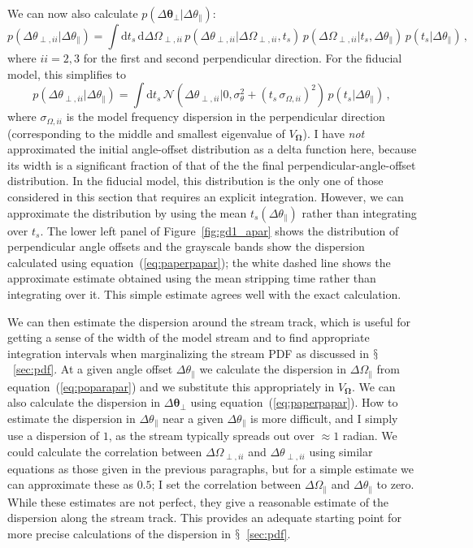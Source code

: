 \documentclass[12pt,preprint]{aastex}
\newcommand{\dd}{\mathrm{d}}
\newcommand{\eqnname}{equation}
\newcommand{\equationname}{\eqnname}
\renewcommand{\figurename}{Figure}
\newcommand{\sectionname}{$\mathsection$}
\renewcommand{\vec}[1]{\ensuremath{\mathbf{#1}}}
\newcommand{\veco}{\ensuremath{\vec{\Omega}}}
\newcommand{\veca}{\ensuremath{\boldsymbol\theta}}
\newcommand{\apar}{\ensuremath{\theta_\parallel}}
\newcommand{\opar}{\ensuremath{\Omega_\parallel}}
\newcommand{\aperp}{\ensuremath{\veca_\perp}}
\newcommand{\aperpii}{\ensuremath{\theta_{\perp,ii}}}
\newcommand{\operpii}{\ensuremath{\Omega_{\perp,ii}}}
\newcommand{\ts}{\ensuremath{t_s}}
\begin{document}
We can now also calculate $p(\Delta \aperp|\Delta \apar)$:
\begin{equation}
  p(\Delta \aperpii|\Delta \apar) = \int \dd \ts \,\dd \Delta
  \operpii \,p(\Delta \aperpii|\Delta \operpii,\ts)\,p(\Delta \operpii|\ts,\Delta \apar)\,p(\ts|\Delta \apar)\,,
\end{equation}
where $ii=2,3$ for the first and second perpendicular direction. For
the fiducial model, this simplifies to
\begin{equation}\label{eq:paperpapar}
  p(\Delta \aperpii|\Delta \apar) = \int \dd \ts \,\mathcal{N}\left(\Delta \aperpii|0,\sigma_{\theta}^2+(\ts\,\sigma_{\Omega,ii})^2\right)\,p(\ts|\Delta \apar)\,,
\end{equation}
where $\sigma_{\Omega,ii}$ is the model frequency dispersion in the
perpendicular direction (corresponding to the middle and smallest
eigenvalue of $V_\veco$). I have \emph{not} approximated the initial
angle-offset distribution as a delta function here, because its width
is a significant fraction of that of the the final
perpendicular-angle-offset distribution. In the fiducial model, this
distribution is the only one of those considered in this section that
requires an explicit integration. However, we can approximate the
distribution by using the mean $\ts(\Delta \apar)$ rather than
integrating over $\ts$. The lower left panel of
\figurename~\ref{fig:gd1_apar} shows the distribution of perpendicular
angle offsets and the grayscale bands show the dispersion calculated
using \equationname~(\ref{eq:paperpapar}); the white dashed line shows
the approximate estimate obtained using the mean stripping time rather
than integrating over it. This simple estimate agrees well with the
exact calculation.

We can then estimate the dispersion around the stream track, which is
useful for getting a sense of the width of the model stream and to
find appropriate integration intervals when marginalizing the stream
PDF as discussed in \sectionname~\ref{sec:pdf}. At a given angle
offset $\Delta \apar$ we calculate the dispersion in $\Delta \opar$
from \equationname~(\ref{eq:poparapar}) and we substitute this
appropriately in $V_\veco$. We can also calculate the dispersion in
$\Delta \aperp$ using \equationname~(\ref{eq:paperpapar}). How to
estimate the dispersion in $\Delta \apar$ near a given $\Delta \apar$
is more difficult, and I simply use a dispersion of $1$, as the stream
typically spreads out over $\approx 1$ radian. We could calculate the
correlation between $\Delta \operpii$ and $\Delta \aperpii$ using
similar equations as those given in the previous paragraphs, but for a
simple estimate we can approximate these as $0.5$; I set the
correlation between $\Delta \opar$ and $\Delta \apar$ to zero. While
these estimates are not perfect, they give a reasonable estimate of
the dispersion along the stream track. This provides an adequate
starting point for more precise calculations of the dispersion in
\sectionname~\ref{sec:pdf}.
\end{document}
